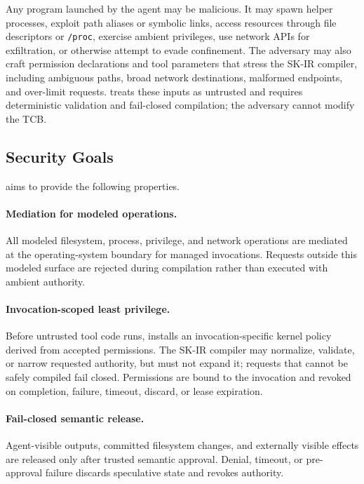 Any program launched by the agent may be malicious. It may spawn helper
processes, exploit path aliases or symbolic links, access resources through file
descriptors or \texttt{/proc}, exercise ambient privileges, use network APIs for
exfiltration, or otherwise attempt to evade confinement. The adversary may also
craft permission declarations and tool parameters that stress the SK-IR compiler,
including ambiguous paths, broad network destinations, malformed endpoints, and
over-limit requests. \SystemName treats these inputs as untrusted and requires
deterministic validation and fail-closed compilation; the adversary cannot modify
the TCB.

\subsection{Security Goals}
\label{sec:threat:goals}

\SystemName aims to provide the following properties.

\paragraph{Mediation for modeled operations.}
All modeled filesystem, process, privilege, and network operations are mediated
at the operating-system boundary for managed invocations. Requests outside this
modeled surface are rejected during compilation rather than executed with ambient
authority.

\paragraph{Invocation-scoped least privilege.}
Before untrusted tool code runs, \SystemName installs an invocation-specific
kernel policy derived from accepted permissions. The SK-IR compiler may
normalize, validate, or narrow requested authority, but must not expand it;
requests that cannot be safely compiled fail closed. Permissions are bound to
the invocation and revoked on completion, failure, timeout, discard, or lease
expiration.

\paragraph{Fail-closed semantic release.}
Agent-visible outputs, committed filesystem changes, and externally visible
effects are released only after trusted semantic approval. Denial, timeout, or
pre-approval failure discards speculative state and revokes authority.

